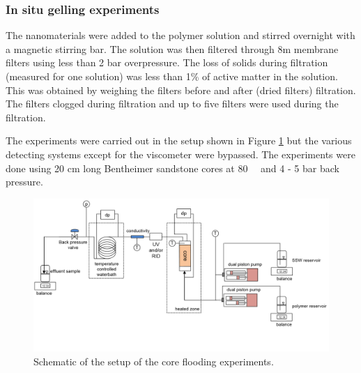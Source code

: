 \documentclass[nanomaterials,article,submit,moreauthors,pdftex]{Definitions/mdpi}
\begin{document}
\subsubsection{In situ gelling experiments}

The nanomaterials were added to the polymer solution and stirred overnight with a magnetic stirring bar. The solution was then filtered through 8\micro m membrane filters using less than 2 bar overpressure. The loss of solids during filtration (measured for one solution) was less than 1\% of active matter in the solution. This was obtained by weighing the filters before and after (dried filters) filtration. The filters clogged during filtration and up to five filters were used during the filtration.

The experiments were carried out in the setup shown in Figure \ref{fig:experimentalSetup} but the various detecting systems except for the viscometer were bypassed. The experiments were done using 20 cm long Bentheimer sandstone cores at 80~\celsius~ and 4 - 5 bar back pressure.

\begin{figure}[h!]
        \includegraphics[width=\textwidth]{fig/experimentalSetup.png}
        \caption{Schematic of the setup of the core flooding experiments.}
        \label{fig:experimentalSetup}
\end{figure}
\end{document}
